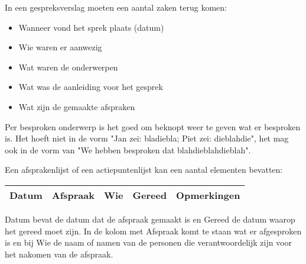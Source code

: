 
In een gespreksverslag moeten een aantal zaken terug komen:
\begin{itemize}
\item Wanneer vond het sprek plaats (datum)
\item Wie waren er aanwezig
\item Wat waren de onderwerpen
\item Wat was de aanleiding voor het gesprek
\item Wat zijn de gemaakte afspraken
\end{itemize}

Per besproken onderwerp is het goed om beknopt weer te geven wat er besproken is. Het hoeft niet in de vorm "Jan zei: bladiebla; Piet zei: dieblahdie", het mag ook in de vorm van "We hebben besproken dat blahdieblahdieblah".

Een afsprakenlijst of een actiepuntenlijst kan een aantal elementen bevatten:
\begin{center}
\begin{tabular}{ | c | c | c | c | c | }
\hline
 Datum & Afspraak & Wie & Gereed & Opmerkingen \\ 
\hline
\end{tabular}
\end{center}

Datum bevat de datum dat de afspraak gemaakt is en Gereed de datum waarop het gereed moet zijn. In de kolom met Afspraak komt te staan wat er afgesproken is en bij Wie de naam of namen van de personen die verantwoordelijk zijn voor het nakomen van de afspraak.

